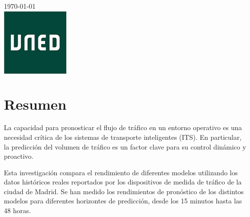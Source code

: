 \documentclass[]{book}
\begin{document}
\begin{titlepage}


{\large \today}\\[2cm] %


\includegraphics{images/university}\\[1cm] %


\vfill %

\end{titlepage}



\chapter*{Resumen}

La capacidad para pronosticar el flujo de tráfico en un entorno operativo es una necesidad crítica de los sistemas de transporte inteligentes (ITS). En particular, la predicción del volumen de tráfico es un factor clave para su control dinámico y proactivo.

Esta investigación compara el rendimiento de diferentes modelos utilizando los datos históricos reales reportados por los dispositivos de medida de tráfico de la ciudad de Madrid. Se han medido los rendimientos de pronóstico de los distintos modelos para diferentes horizontes de predicción, desde los 15 minutos hasta las 48 horas.
\end{document}
